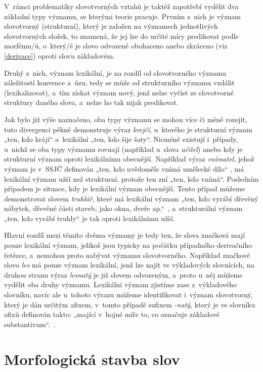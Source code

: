V~rámci problematiky slovotvorných vztahů je taktéž zapotřebí vydělit
dva základní typy významu, se kterými teorie pracuje. Prvním z~nich je
význam slovotvorný (strukturní), který je založen na významech
jednotlivých slovotvorných složek, to znamená, že jej lze do určité míry
predikovat podle morfému/ů, o~který/é je slovo odvozené obohaceno anebo
zkráceno (viz \ref{derivace}) oproti slovu základovém.
\parencite{enc-slovot-vyznam17}

Druhý z~nich, význam lexikální, je na rozdíl od slovotvorného významu
záležitostí konvence a~úzu, tedy se může od strukturního významu vzdálit
(lexikalizovat), a~tím získat význam nový, jenž nelze vyčíst ze
slovotvorné struktury daného slova, a~nelze ho tak nijak predikovat.
\parencite{enc-slovot-vyznam17}

Jak bylo již výše naznačeno, oba typy významu se mohou více či méně
rozejít, tuto divergenci pěkně demonstruje výraz \emph{krejčí},
u~kterého je strukturní význam „ten, kdo krájí`` a~lexikální „ten, kdo
šije šaty``. Nicméně existují i~případy, u~nichž se oba typy významu
rovnají (například u~slova \emph{učitel}) anebo kdy je strukturní význam
oproti lexikálnímu obecnější. Například výraz \emph{vnímatel}, jehož
význam je v~SSJČ definován „ten, kdo uvědoměle vnímá umělecké dílo``
\parencite{ssjc}, má lexikální význam užší než strukturní, protože ten
zní „ten, kdo vnímá``. Posledním případem je situace, kdy je lexikální
význam obecnější. Tento případ můžeme demonstrovat slovem
\emph{truhlář}, které má lexikální význam „ten, kdo vyrábí dřevěný
nábytek, dřevěné části staveb, jako okna, dveře ap.``~\parencite{ssjc},
a~strukturální význam „ten, kdo vyrábí truhly`` je tak oproti
lexikálnímu užší.

Hlavní rozdíl mezi těmito dvěma významy je tedy ten, že slova značková
mají pouze lexikální význam, jelikož jsou typicky na počátku případného
derivačního řetězce, a~nemohou proto nabývat významu slovotvorného.
Například značkové slovo \emph{les} má pouze význam lexikální, jenž lze
najít ve výkladových slovnících, na druhou stranu výraz \emph{lesnatý}
je již slovem odvozeným, a~proto u~něj můžeme vydělit oba druhy významu.
Lexikální význam zjistíme zase z~výkladového slovníku, navíc ale
u~tohoto výrazu můžeme identifikovat i~význam slovotvorný, který je dán
určitým afixem, v~tomto případě sufixem \emph{-natý}, který je ve
slovníku afixů definován takto: „mající v~hojné míře to, co označuje
základové substantivum``.~\parencite{simandl2016}.

\hypertarget{morfologickuxe1-stavba-slov}{%
\section{Morfologická stavba
slov}\label{morfologickuxe1-stavba-slov}}

